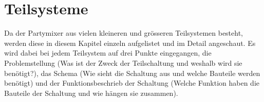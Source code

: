 \newpage
\section{Teilsysteme}
\label{sec:Teilsysteme}

Da der Partymixer aus vielen kleineren und grösseren Teilsystemen besteht, werden diese in diesem Kapitel einzeln aufgelistet und im Detail angeschaut.
Es wird dabei bei jedem Teilsystem auf drei Punkte eingegangen, die Problemstellung (Was ist der Zweck der Teilschaltung und weshalb wird sie benötigt?), das Schema (Wie sieht die Schaltung aus und welche Bauteile werden benötigt) und der Funktionsbeschrieb der Schaltung (Welche Funktion haben die Bauteile der Schaltung und wie hängen sie zusammen).